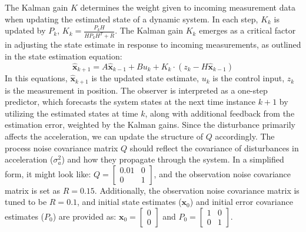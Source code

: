 The Kalman gain $K$ determines the weight given to incoming measurement data when updating the estimated state of a dynamic system. In each step, $K_k$ is updated by $P_k$, $K_k=\frac{P_kH}{HP_kH^T+R}$. The Kalman gain $K_k$ emerges as a critical factor in adjusting the state estimate in response to incoming measurements, as outlined in the state estimation equation:
\begin{equation}
    \hat{\mathbf{x}}_{k+1} = A\hat{\mathbf{x}}_{k-1} + Bu_k + K_k\cdot(z_k - H\hat{\mathbf{x}}_{k-1})
    \label{eq:kf_est}
\end{equation} 
In this equations, $\hat{\mathbf{x}}_{k+1}$ is the updated state estimate, $u_k$ is the control input, $z_k$ is the measurement in position. The observer is interpreted as a one-step predictor, which forecasts the system states at the next time instance $k+1$ by utilizing the estimated states at time $k$, along with additional feedback from the estimation error, weighted by the Kalman gains. Since the disturbance primarily affects the acceleration, we can update the structure of $Q$ accordingly. The process noise covariance matrix $Q$ should reflect the covariance of disturbances in acceleration ($\sigma_a^2$) and how they propagate through the system. In a simplified form, it might look like: $Q = \begin{bmatrix}0.01 & 0 \\0 & 1\end{bmatrix}$, and the observation noise covariance matrix is set as $R = 0.15$. Additionally, the observation noise covariance matrix is tuned to be $R = 0.1$, and initial state estimates ($\mathbf{x}_0$) and initial error covariance estimates ($P_0$) are provided as: $\mathbf{x}_0 = \begin{bmatrix} 0 \\ 0 \end{bmatrix}$ and $P_0 = \begin{bmatrix}1 & 0 \\0 & 1\end{bmatrix}$. 

